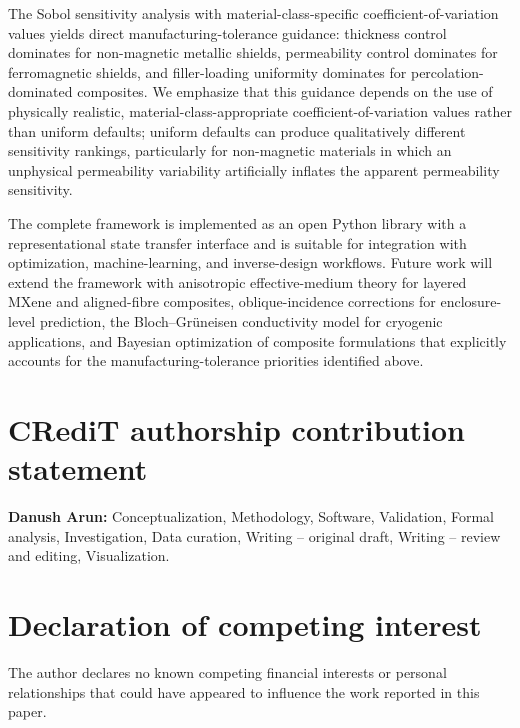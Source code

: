 \documentclass[review,3p,authoryear]{elsarticle}
\begin{document}
The Sobol sensitivity analysis with material-class-specific coefficient-of-variation values yields direct manufacturing-tolerance guidance: thickness control dominates for non-magnetic metallic shields, permeability control dominates for ferromagnetic shields, and filler-loading uniformity dominates for percolation-dominated composites. We emphasize that this guidance depends on the use of physically realistic, material-class-appropriate coefficient-of-variation values rather than uniform defaults; uniform defaults can produce qualitatively different sensitivity rankings, particularly for non-magnetic materials in which an unphysical permeability variability artificially inflates the apparent permeability sensitivity.

The complete framework is implemented as an open Python library with a representational state transfer interface and is suitable for integration with optimization, machine-learning, and inverse-design workflows. Future work will extend the framework with anisotropic effective-medium theory for layered MXene and aligned-fibre composites, oblique-incidence corrections for enclosure-level prediction, the Bloch--Gr\"uneisen conductivity model for cryogenic applications, and Bayesian optimization of composite formulations that explicitly accounts for the manufacturing-tolerance priorities identified above.

\section*{CRediT authorship contribution statement}

\textbf{Danush Arun:} Conceptualization, Methodology, Software, Validation, Formal analysis, Investigation, Data curation, Writing -- original draft, Writing -- review and editing, Visualization.

\section*{Declaration of competing interest}

The author declares no known competing financial interests or personal relationships that could have appeared to influence the work reported in this paper.
\end{document}
